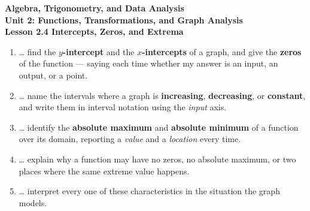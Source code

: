 \documentclass[10pt]{article}
\begin{document}
\vspace{-0.8in}

\begin{center}
  {\color{white}\textbf{\LARGE Algebra, Trigonometry, and Data Analysis}}\\[4pt]
  {\color{mistmid}\large\textbf{Unit 2: Functions, Transformations, and Graph Analysis}}\\[6pt]
  {\color{white}\textbf{\large Lesson 2.4 \quad Intercepts, Zeros, and Extrema}}
\end{center}

\vspace{0.22in}
\namedateperiod
\vspace{0.18in}

\begin{learningtargetbox}
\small
\begin{enumerate}[leftmargin=1.5em, itemsep=5pt]
  \item \ldots{} find the \textbf{$y$-intercept} and the \textbf{$x$-intercepts} of a graph, and give
        the \textbf{zeros} of the function --- saying each time whether my answer is an input, an
        output, or a point.
  \item \ldots{} name the intervals where a graph is \textbf{increasing}, \textbf{decreasing}, or
        \textbf{constant}, and write them in interval notation using the \emph{input} axis.
  \item \ldots{} identify the \textbf{absolute maximum} and \textbf{absolute minimum} of a function
        over its domain, reporting a \emph{value} and a \emph{location} every time.
  \item \ldots{} explain why a function may have no zeros, no absolute maximum, or two places where
        the same extreme value happens.
  \item \ldots{} interpret every one of these characteristics in the situation the graph models.
\end{enumerate}
\end{learningtargetbox}

\vspace{0.14in}
\end{document}
